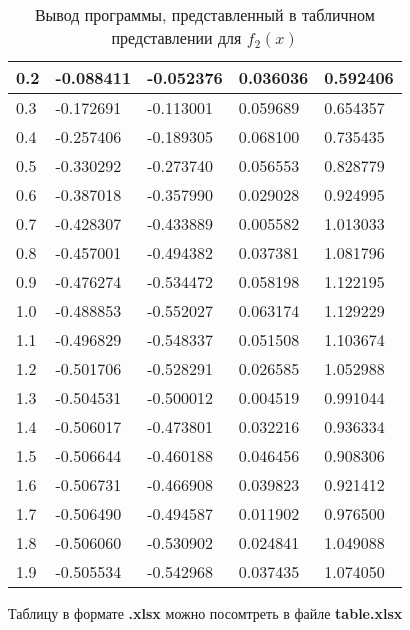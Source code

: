\documentclass[13pt, a4paper, twoside]{article}
\begin{document}
\begin{table}[!ht]
\begin{tabular}{|l|l|l|l|l|}
        0.2 & -0.088411 & -0.052376 & 0.036036 & 0.592406 \\ \hline
        0.3 & -0.172691 & -0.113001 & 0.059689 & 0.654357 \\ \hline
        0.4 & -0.257406 & -0.189305 & 0.068100 & 0.735435 \\ \hline
        0.5 & -0.330292 & -0.273740 & 0.056553 & 0.828779 \\ \hline
        0.6 & -0.387018 & -0.357990 & 0.029028 & 0.924995 \\ \hline
        0.7 & -0.428307 & -0.433889 & 0.005582 & 1.013033 \\ \hline
        0.8 & -0.457001 & -0.494382 & 0.037381 & 1.081796 \\ \hline
        0.9 & -0.476274 & -0.534472 & 0.058198 & 1.122195 \\ \hline
        1.0 & -0.488853 & -0.552027 & 0.063174 & 1.129229 \\ \hline
        1.1 & -0.496829 & -0.548337 & 0.051508 & 1.103674 \\ \hline
        1.2 & -0.501706 & -0.528291 & 0.026585 & 1.052988 \\ \hline
        1.3 & -0.504531 & -0.500012 & 0.004519 & 0.991044 \\ \hline
        1.4 & -0.506017 & -0.473801 & 0.032216 & 0.936334 \\ \hline
        1.5 & -0.506644 & -0.460188 & 0.046456 & 0.908306 \\ \hline
        1.6 & -0.506731 & -0.466908 & 0.039823 & 0.921412 \\ \hline
        1.7 & -0.506490 & -0.494587 & 0.011902 & 0.976500 \\ \hline
        1.8 & -0.506060 & -0.530902 & 0.024841 & 1.049088 \\ \hline
        1.9 & -0.505534 & -0.542968 & 0.037435 & 1.074050 \\ \hline
    \end{tabular}
    \caption{Вывод программы, представленный в табличном представлении для $f_2(x)$}
\end{table}
\tub Таблицу в формате \textbf{.xlsx} можно посомтреть в файле \textbf{table.xlsx}
\end{document}

